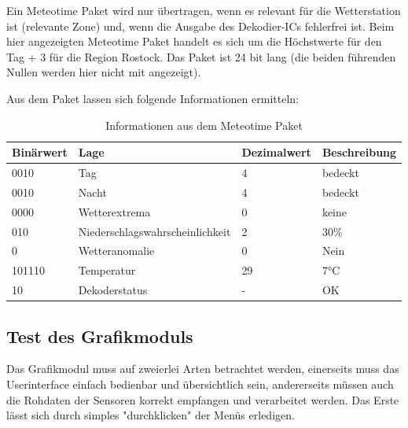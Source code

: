 \documentclass[a4paper,11pt]{article}
\begin{document}
\noindent
Ein Meteotime Paket wird nur übertragen, wenn es relevant für die Wetterstation ist (relevante Zone) und, wenn die Ausgabe des Dekodier-ICs fehlerfrei ist. 
Beim hier angezeigten Meteotime Paket handelt es sich um die Höchstwerte für den Tag + 3 für die Region Rostock. Das Paket ist 24 bit lang (die beiden führenden Nullen
werden hier nicht mit angezeigt). 

\vspace{0.2cm}
\noindent
Aus dem Paket lassen sich folgende Informationen ermitteln:

\begin{table}[H]
  \centering
  \begin{tabular}{|l|l|l|l|}
  \hline
  \textbf{Binärwert} & \textbf{Lage}                   & \textbf{Dezimalwert} & \textbf{Beschreibung} \\ \hline
  0010               & Tag                             & 4                    & bedeckt               \\ \hline
  0010               & Nacht                           & 4                    & bedeckt               \\ \hline
  0000               & Wetterextrema                   & 0                    & keine                 \\ \hline
  010                & Niederschlagswahrscheinlichkeit & 2                    & 30\%                  \\ \hline
  0                  & Wetteranomalie                  & 0                    & Nein                  \\ \hline
  101110             & Temperatur                      & 29                   & 7°C                   \\ \hline
  10                 & Dekoderstatus                   & -                    & OK                    \\ \hline
  \end{tabular}
  \caption{Informationen aus dem Meteotime Paket}
  \label{tab:meteopacket}
  \end{table}

\subsection{Test des Grafikmoduls}
Das Grafikmodul muss auf zweierlei Arten betrachtet werden, einerseits muss das Userinterface einfach bedienbar und übersichtlich sein, andererseits müssen auch die Rohdaten der Sensoren korrekt empfangen und verarbeitet werden. Das Erste lässt sich durch simples "durchklicken" der Menüs erledigen.
\end{document}
